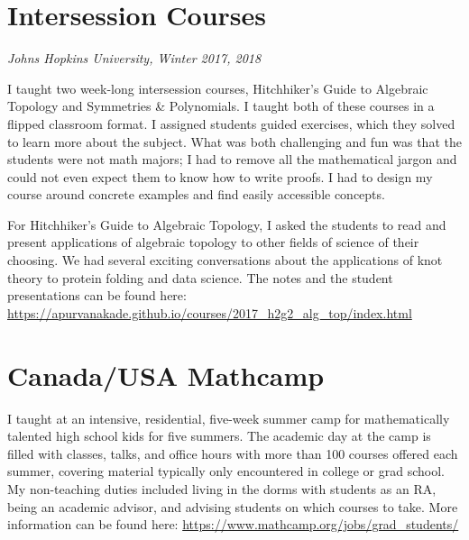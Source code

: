 \documentclass[
]{report}
\begin{document}
\hypertarget{intersession-courses}{%
\section{Intersession Courses}\label{intersession-courses}}

\emph{Johns Hopkins University, Winter 2017, 2018}

I taught two week-long intersession courses, Hitchhiker's Guide to Algebraic Topology and Symmetries \& Polynomials. I taught both of these courses in a flipped classroom format. I assigned students guided exercises, which they solved to learn more about the subject. What was both challenging and fun was that the students were not math majors; I had to remove all the mathematical jargon and could not even expect them to know how to write proofs. I had to design my course around concrete examples and find easily accessible concepts.

For Hitchhiker's Guide to Algebraic Topology, I asked the students to read and present applications of algebraic topology to other fields of science of their choosing. We had several exciting conversations about the applications of knot theory to protein folding and data science. The notes and the student presentations can be found here: \url{https://apurvanakade.github.io/courses/2017_h2g2_alg_top/index.html}

\hypertarget{canadausa-mathcamp}{%
\section{Canada/USA Mathcamp}\label{canadausa-mathcamp}}

I taught at an intensive, residential, five-week summer camp for mathematically talented high school
kids for five summers. The academic day at the camp is filled with classes, talks, and office hours with
more than 100 courses offered each summer, covering material typically only encountered in college or
grad school. My non-teaching duties included living in the dorms with students as an RA, being an
academic advisor, and advising students on which courses to take. More information can be found here:
\url{https://www.mathcamp.org/jobs/grad_students/}
\end{document}
